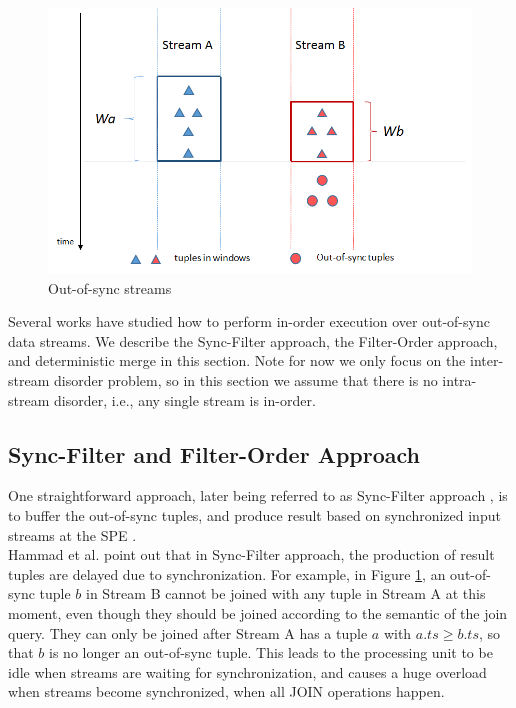 \documentclass[a4paper, 11pt, twoside]{report}
\begin{document}
\begin{figure}[h]
\centering
\includegraphics[width=5in]{out-of-sync}
\caption{Out-of-sync streams\label{fig:out-of-sync}}
\end{figure}

Several works have studied how to perform in-order execution over out-of-sync data streams. We describe the Sync-Filter approach, the Filter-Order approach, and deterministic merge in this section. Note for now we only focus on the inter-stream disorder problem, so in this section we assume that there is no intra-stream disorder, i.e., any single stream is in-order.\\

\subsection{Sync-Filter and Filter-Order Approach}
\label{subsec:sync-filter_filter-order}

One straightforward approach, later being referred to as Sync-Filter approach \cite{Hammad05optimizingin-order}, is to buffer the out-of-sync tuples, and produce result based on synchronized input streams at the SPE \cite{Srivastava:2004:FTM:1055558.1055596}.\\

Hammad et al. \cite{Hammad05optimizingin-order} point out that in Sync-Filter approach, the production of result tuples are delayed due to synchronization. For example, in Figure \ref{fig:out-of-sync}, an out-of-sync tuple $b$ in Stream B cannot be joined with any tuple in Stream A at this moment, even though they should be joined according to the semantic of the join query. They can only be joined after Stream A has a tuple $a$ with $a.ts \geq b.ts$, so that $b$ is no longer an out-of-sync tuple. This leads to the processing unit to be idle when streams are waiting for synchronization, and causes a huge overload when streams become synchronized, when all JOIN operations happen.\\
\end{document}

